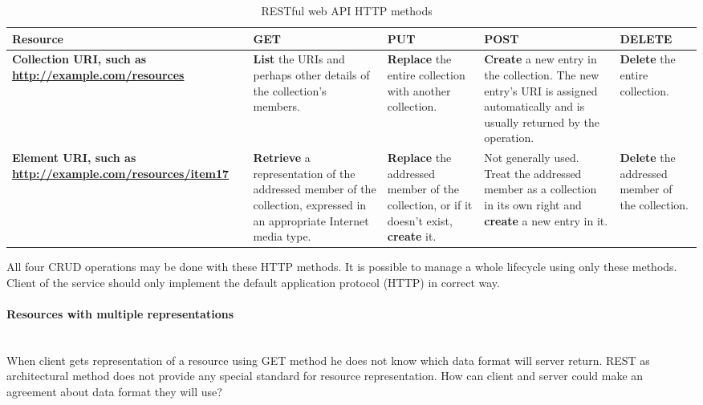 \begin{table}[h]
	\centering	
	\begin{tabularx}{\textwidth}{|X|X|X|X|X|}
		\hline
		\textbf{Resource} & 
		\textbf{GET}  	& 
		\textbf{PUT} 	&
		\textbf{POST} &
		\textbf{DELETE}
	    
	    \tabularnewline
		\hline
			\begin{sloppypar}
				\textbf{Collection URI, such as \url{http://example.com/resources}}
			\end{sloppypar} &
			\textbf{List} the URIs and perhaps other details of the collection's members.&
			\textbf{Replace} the entire collection with another collection.&
			\textbf{Create} a new entry in the collection. The new entry's URI is
			assigned automatically and is usually returned by the operation. &
			\textbf{Delete} the entire collection.
			
	    	\tabularnewline	    	
	    	\hline
	    	\begin{sloppypar}
				\textbf{Element URI, such as \url{http://example.com/resources/item17}} 
			\end{sloppypar} &
			\textbf{Retrieve} a representation of the addressed member of the
			collection, expressed in an appropriate Internet media type. &
			\textbf{Replace} the addressed member of the collection, or if it
			doesn't exist, \textbf{create} it. &			
			Not generally used. Treat the addressed member as a collection in its own
			right and \textbf{create} a new entry in it. &			
			\textbf{Delete} the addressed member of the collection.
	
	    \tabularnewline
		\hline	  
	\end{tabularx} 
	\caption{RESTful web API HTTP methods ~\cite{wikipedia:REST}}
	\label{tbl:rest_http_api}
\end{table}

All four \gls{CRUD} operations may be done with these HTTP methods. It is
possible to manage a whole lifecycle using only these methods. Client of the
service should only implement   the default application protocol (HTTP)
in correct way.

\paragraph{Resources with multiple representations} ~\\
\label{sec:rest_multiple_resource_types}
When client gets representation of a resource using GET method he does not know
which data format will server return. REST as architectural method does not
provide any special standard for resource representation. How can client and
server could make an agreement about data format they will use?


